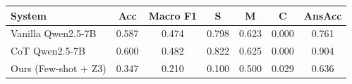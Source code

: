 \begin{tabular}{lcccccc}
\toprule
System & Acc & Macro F1 & S & M & C & AnsAcc \\
\midrule
Vanilla Qwen2.5-7B & 0.587 & 0.474 & 0.798 & 0.623 & 0.000 & 0.761 \\
CoT Qwen2.5-7B & 0.600 & 0.482 & 0.822 & 0.625 & 0.000 & 0.904 \\
Ours (Few-shot + Z3) & 0.347 & 0.210 & 0.100 & 0.500 & 0.029 & 0.636 \\
\bottomrule
\end{tabular}